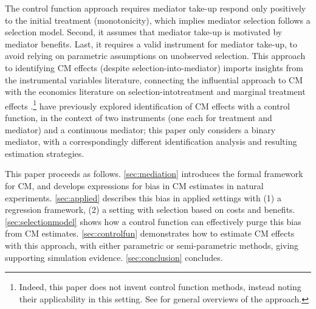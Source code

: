 The control function approach requires mediator take-up respond only positively to the initial treatment (monotonicity), which implies mediator selection follows a selection model.
Second, it assumes that mediator take-up is motivated by mediator benefits.
Last, it requires a valid instrument for mediator take-up, to avoid relying on parametric assumptions on unobserved selection.
This approach to identifying CM effects (despite selection-into-mediator) imports insights from the instrumental variables literature, connecting the influential \cite{imai2010identification} approach to CM with the economics literature on selection-intotreatment and marginal treatment effects \citep{vytlacil2002independence,heckman2004using,heckman2005structural,florens2008identification,kline2019heckits}.\footnote{
    Indeed, this paper does not invent control function methods, instead noting their applicability in this setting.
    See \cite{wooldridge2015control,imbens2007nonadditive} for general overviews of the approach.
}
\cite{frolich2017direct} have previously explored identification of CM effects with a control function, in the context of two instruments (one each for treatment and mediator) and a continuous mediator; this paper only considers a binary mediator, with a correspondingly different identification analysis and resulting estimation strategies.

This paper proceeds as follows.
\autoref{sec:mediation} introduces the formal framework for CM, and develops expressions for bias in CM estimates in natural experiments.
\autoref{sec:applied} describes this bias in applied settings with (1) a regression framework, (2) a setting with selection based on costs and benefits.
\autoref{sec:selectionmodel} shows how a control function can effectively purge this bias from CM estimates.
\autoref{sec:controlfun} demonstrates how to estimate CM effects with this approach, with either parametric or semi-parametric methods, giving supporting simulation evidence.
\autoref{sec:conclusion} concludes.
